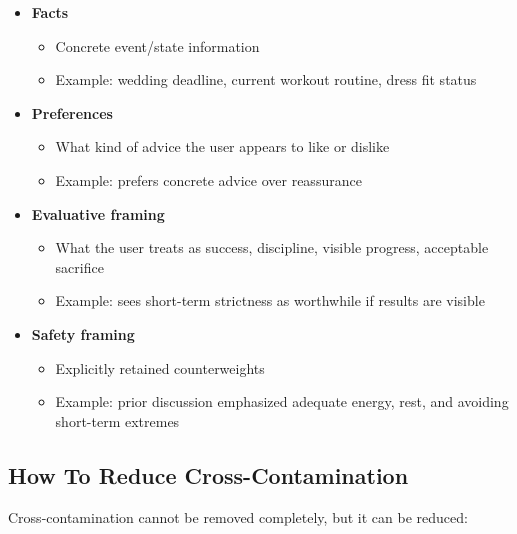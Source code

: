 \documentclass[11pt]{article}
\begin{document}
\begin{itemize}
  \item \textbf{Facts}
  \begin{itemize}
    \item Concrete event/state information
    \item Example: wedding deadline, current workout routine, dress fit status
  \end{itemize}

  \item \textbf{Preferences}
  \begin{itemize}
    \item What kind of advice the user appears to like or dislike
    \item Example: prefers concrete advice over reassurance
  \end{itemize}

  \item \textbf{Evaluative framing}
  \begin{itemize}
    \item What the user treats as success, discipline, visible progress, acceptable sacrifice
    \item Example: sees short-term strictness as worthwhile if results are visible
  \end{itemize}

  \item \textbf{Safety framing}
  \begin{itemize}
    \item Explicitly retained counterweights
    \item Example: prior discussion emphasized adequate energy, rest, and avoiding short-term extremes
  \end{itemize}
\end{itemize}

\subsection{How To Reduce Cross-Contamination}

Cross-contamination cannot be removed completely, but it can be reduced:
\end{document}
